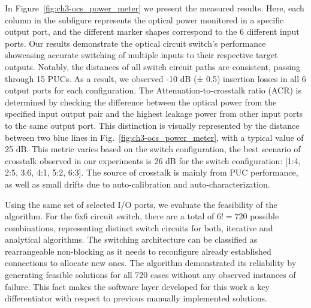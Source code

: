 In Figure~\ref{fig:ch3-ocs_power_meter} we present the measured results.
Here, each column in the subfigure represents the optical power monitored in a specific output port, and the different marker shapes correspond to the 6 different input ports.
Our results demonstrate the optical circuit switch’s performance showcasing accurate switching of multiple inputs to their respective target outputs.
Notably, the distances of all switch circuit paths are consistent, passing through 15 PUCs.
As a result, we observed -10 dB (± 0.5) insertion losses in all 6 output ports for each configuration.
The Attenuation-to-crosstalk ratio (ACR) is determined by checking the difference between the optical power from the specified input output pair and the highest leakage power from other input ports to the same output port.
This distinction is visually represented by the distance between two blue lines in Fig.~\ref{fig:ch3-ocs_power_meter}, with a typical value of 25 dB.
This metric varies based on the switch configuration, the best scenario of crosstalk observed in our experiments is 26 dB for the switch configuration: [1:4, 2:5, 3:6, 4:1, 5:2, 6:3].
The source of crosstalk is mainly from PUC performance, as well as small drifts due to auto-calibration and auto-characterization.

%
%

Using the same set of selected I/O ports, we evaluate the feasibility of the algorithm.
For the 6x6 circuit switch, there are a total of \(6!
=720\) possible combinations, representing distinct switch circuits for both, iterative and analytical algorithms.
The switching architecture can be classified as rearrangeable non-blocking as it needs to reconfigure already established connections to allocate new ones.
The algorithm demonstrated its reliability by generating feasible solutions for all 720 cases without any observed instances of failure.
This fact makes the software layer developed for this work a key differentiator with respect to previous manually implemented solutions.

